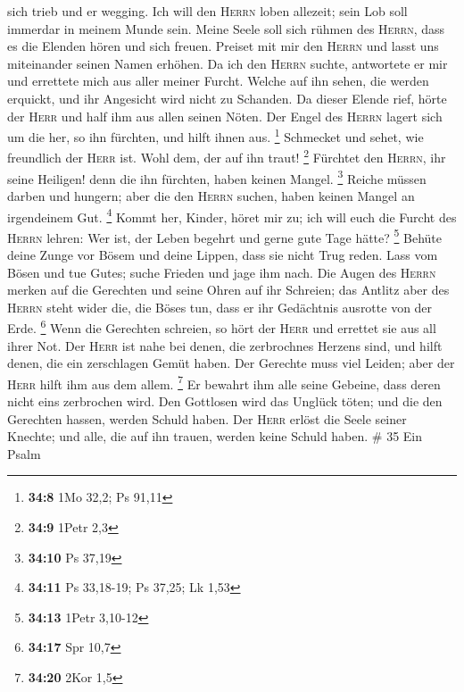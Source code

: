 sich trieb und er wegging.  Ich will den \textsc{Herrn}
loben allezeit; sein Lob soll immerdar in meinem Munde sein.
 Meine Seele soll sich rühmen des \textsc{Herrn}, dass es
die Elenden hören und sich freuen.  Preiset mit mir den
\textsc{Herrn} und lasst uns miteinander seinen Namen erhöhen.
 Da ich den \textsc{Herrn} suchte, antwortete er mir und
errettete mich aus aller meiner Furcht.  Welche auf ihn
sehen, die werden erquickt, und ihr Angesicht wird nicht zu Schanden.
 Da dieser Elende rief, hörte der \textsc{Herr} und half
ihm aus allen seinen Nöten.  Der Engel des \textsc{Herrn}
lagert sich um die her, so ihn fürchten, und hilft ihnen aus.
\footnote{\textbf{34:8} 1Mo 32,2; Ps 91,11}  Schmecket und
sehet, wie freundlich der \textsc{Herr} ist. Wohl dem, der auf ihn
traut! \footnote{\textbf{34:9} 1Petr 2,3}  Fürchtet den
\textsc{Herrn}, ihr seine Heiligen! denn die ihn fürchten, haben keinen
Mangel. \footnote{\textbf{34:10} Ps 37,19}  Reiche müssen
darben und hungern; aber die den \textsc{Herrn} suchen, haben keinen
Mangel an irgendeinem Gut. \footnote{\textbf{34:11} Ps 33,18-19; Ps
  37,25; Lk 1,53}  Kommt her, Kinder, höret mir zu; ich
will euch die Furcht des \textsc{Herrn} lehren:  Wer ist,
der Leben begehrt und gerne gute Tage hätte? \footnote{\textbf{34:13}
  1Petr 3,10-12}  Behüte deine Zunge vor Bösem und deine
Lippen, dass sie nicht Trug reden.  Lass vom Bösen und
tue Gutes; suche Frieden und jage ihm nach.  Die Augen
des \textsc{Herrn} merken auf die Gerechten und seine Ohren auf ihr
Schreien;  das Antlitz aber des \textsc{Herrn} steht
wider die, die Böses tun, dass er ihr Gedächtnis ausrotte von der Erde.
\footnote{\textbf{34:17} Spr 10,7}  Wenn die Gerechten
schreien, so hört der \textsc{Herr} und errettet sie aus all ihrer Not.
 Der \textsc{Herr} ist nahe bei denen, die zerbrochnes
Herzens sind, und hilft denen, die ein zerschlagen Gemüt haben.
 Der Gerechte muss viel Leiden; aber der \textsc{Herr}
hilft ihm aus dem allem. \footnote{\textbf{34:20} 2Kor 1,5}
 Er bewahrt ihm alle seine Gebeine, dass deren nicht eins
zerbrochen wird.  Den Gottlosen wird das Unglück töten;
und die den Gerechten hassen, werden Schuld haben.  Der
\textsc{Herr} erlöst die Seele seiner Knechte; und alle, die auf ihn
trauen, werden keine Schuld haben. \# 35  Ein Psalm
